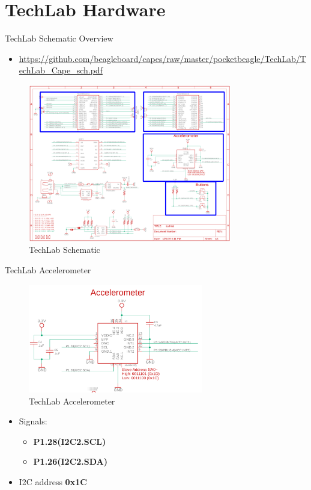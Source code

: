 \section{TechLab Hardware}

\begin{frame}
	{TechLab Schematic Overview}
	\begin{itemize}
		\item
			\url{https://github.com/beagleboard/capes/raw/master/pocketbeagle/TechLab/TechLab_Cape_sch.pdf}
	\end{itemize}


	     \begin{figure}[H]
		     \includegraphics[width=3.5in]{IMAGES/techlab-schematic-annotated}
				       \caption{TechLab Schematic}
	     \end{figure}
\end{frame}

\begin{frame}
	{TechLab Accelerometer}
	     \begin{figure}[H]
		     \includegraphics[width=3in]{IMAGES/techlab-accel}
				       \caption{TechLab Accelerometer}
	     \end{figure}
	     \begin{itemize}
		     \item
		Signals:
	\begin{itemize}
		\item
			\textbf{P1.28(I2C2.SCL)}
		\item
			\textbf{P1.26(I2C2.SDA)}
	\end{itemize}
		\item
		I2C address \textbf{0x1C}
	\end{itemize}
\end{frame}

